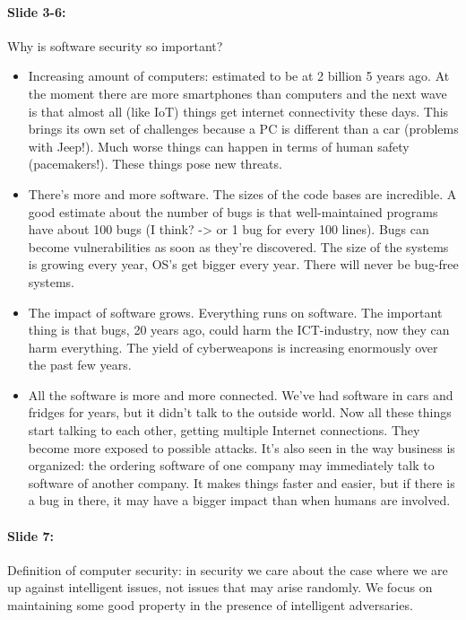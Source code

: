 \documentclass[10pt,a4paper]{report}
\begin{document}
\paragraph{Slide 3-6:} Why is software security so important?
\begin{itemize}
\item Increasing amount of computers: estimated to be at 2 billion 5 years ago. At the moment there are more smartphones than computers and the next wave is that almost all (like IoT) things get internet connectivity these days. This brings its own set of challenges because a PC is different than a car (problems with Jeep!). Much worse things can happen in terms of human safety (pacemakers!). These things pose new threats.
\item There's more and more software. The sizes of the code bases are incredible. A good estimate about the number of bugs is that well-maintained programs have about 100 bugs (I think? -> or 1 bug for every 100 lines). Bugs can become vulnerabilities as soon as they're discovered. The size of the systems is growing every year, OS's get bigger every year. There will never be bug-free systems. 
\item The impact of software grows. Everything runs on software. The important thing is that bugs, 20 years ago, could harm the ICT-industry, now they can harm everything. The yield of cyberweapons is increasing enormously over the past few years. 
\item All the software is more and more connected. We've had software in cars and fridges for years, but it didn't talk to the outside world. Now all these things start talking to each other, getting multiple Internet connections. They become more exposed to possible attacks. It's also seen in the way business is organized: the ordering software of one company may immediately talk to software of another company. It makes things faster and easier, but if there is a bug in there, it may have a bigger impact than when humans are involved.
\end{itemize}

\paragraph{Slide 7:} Definition of computer security: in security we care about the case where we are up against intelligent issues, not issues that may arise randomly. We focus on maintaining some good property in the presence of intelligent adversaries.
\end{document}
